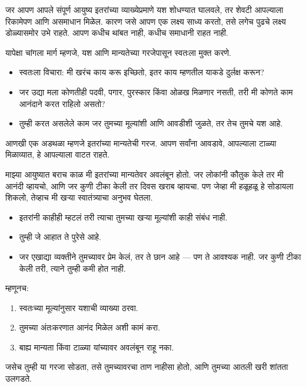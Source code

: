 जर आपण आपले संपूर्ण आयुष्य इतरांच्या व्याख्येप्रमाणे यश शोधण्यात घालवले, 
तर शेवटी आपल्याला रिकामेपण आणि असमाधान मिळेल. 
कारण जसे आपण एक लक्ष्य साध्य करतो, 
तसे लगेच पुढचे लक्ष्य डोळ्यासमोर उभे राहते. 
आपण कधीच थांबत नाही, कधीच समाधानी राहत नाही. 

यापेक्षा चांगला मार्ग म्हणजे, 
यश आणि मान्यतेच्या गरजेपासून स्वतःला मुक्त करणे. 

\begin{itemize}
\item स्वतःला विचारा: 
मी खरंच काय करू इच्छितो, इतर काय म्हणतील याकडे दुर्लक्ष करून? 

\item जर उद्या मला कोणतीही पदवी, पगार, पुरस्कार किंवा ओळख मिळणार नसती, 
तरी मी कोणते काम आनंदाने करत राहिलो असतो? 

\item तुम्ही करत असलेले काम जर तुमच्या मूल्यांशी आणि आवडीशी जुळते, 
तर तेच तुमचे यश आहे. 
\end{itemize}

आणखी एक अडथळा म्हणजे इतरांच्या मान्यतेची गरज. 
आपण सर्वांना आवडावे, आपल्याला टाळ्या मिळाव्यात, 
हे आपल्याला वाटत राहते. 

माझ्या आयुष्यात बराच काळ मी इतरांच्या मान्यतेवर अवलंबून होतो. 
जर लोकांनी कौतुक केले तर मी आनंदी व्हायचो, 
आणि जर कुणी टीका केली तर दिवस खराब व्हायचा. 
पण जेव्हा मी हळूहळू हे सोडायला शिकलो, 
तेव्हाच मी खऱ्या स्वातंत्र्याचा अनुभव घेतला. 

\begin{itemize}
\item इतरांनी काहीही म्हटलं तरी त्याचा तुमच्या खऱ्या मूल्यांशी काही संबंध नाही. 

\item तुम्ही जे आहात ते पुरेसे आहे. 

\item जर एखाद्या व्यक्तीने तुमच्यावर प्रेम केलं, 
तर ते छान आहे — पण ते आवश्यक नाही. 
जर कुणी टीका केली तरी, त्याने तुम्ही कमी होत नाही. 
\end{itemize}

म्हणूनच: 

\begin{enumerate}
\item स्वतःच्या मूल्यांनुसार यशाची व्याख्या ठरवा. 
\item तुमच्या अंतःकरणात आनंद मिळेल अशी कामं करा. 
\item बाह्य मान्यता किंवा टाळ्या यांच्यावर अवलंबून राहू नका. 
\end{enumerate}

जसेच तुम्ही या गरजा सोडता, 
तसे तुमच्यावरचा ताण नाहीसा होतो, 
आणि तुमच्या आतली खरी शांतता उलगडते.



